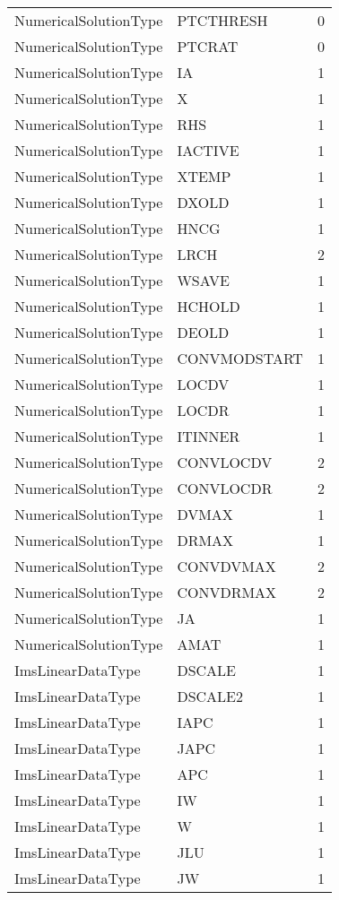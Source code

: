 \begin{longtable}{p{6cm} p{4cm} p{2cm} }
NumericalSolutionType &  PTCTHRESH & 0 \\ 
NumericalSolutionType &  PTCRAT & 0 \\ 
NumericalSolutionType &  IA & 1 \\ 
NumericalSolutionType &  X & 1 \\ 
NumericalSolutionType &  RHS & 1 \\ 
NumericalSolutionType &  IACTIVE & 1 \\ 
NumericalSolutionType &  XTEMP & 1 \\ 
NumericalSolutionType &  DXOLD & 1 \\ 
NumericalSolutionType &  HNCG & 1 \\ 
NumericalSolutionType &  LRCH & 2 \\ 
NumericalSolutionType &  WSAVE & 1 \\ 
NumericalSolutionType &  HCHOLD & 1 \\ 
NumericalSolutionType &  DEOLD & 1 \\ 
NumericalSolutionType &  CONVMODSTART & 1 \\ 
NumericalSolutionType &  LOCDV & 1 \\ 
NumericalSolutionType &  LOCDR & 1 \\ 
NumericalSolutionType &  ITINNER & 1 \\ 
NumericalSolutionType &  CONVLOCDV & 2 \\ 
NumericalSolutionType &  CONVLOCDR & 2 \\ 
NumericalSolutionType &  DVMAX & 1 \\ 
NumericalSolutionType &  DRMAX & 1 \\ 
NumericalSolutionType &  CONVDVMAX & 2 \\ 
NumericalSolutionType &  CONVDRMAX & 2 \\ 
NumericalSolutionType &  JA & 1 \\ 
NumericalSolutionType &  AMAT & 1 \\ 
ImsLinearDataType &  DSCALE & 1 \\ 
ImsLinearDataType &  DSCALE2 & 1 \\ 
ImsLinearDataType &  IAPC & 1 \\ 
ImsLinearDataType &  JAPC & 1 \\ 
ImsLinearDataType &  APC & 1 \\ 
ImsLinearDataType &  IW & 1 \\ 
ImsLinearDataType &  W & 1 \\ 
ImsLinearDataType &  JLU & 1 \\ 
ImsLinearDataType &  JW & 1 \\ 

\end{longtable}
